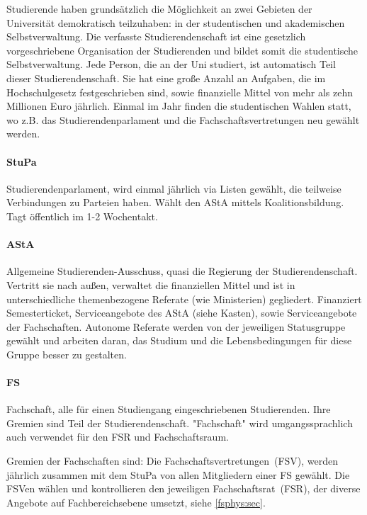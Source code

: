 \begin{multicols*}{2}
Studierende haben grundsätzlich die Möglichkeit an zwei Gebieten der Universität demokratisch teilzuhaben: in der studentischen und akademischen Selbstverwaltung.
Die verfasste Studierendenschaft ist eine gesetzlich vorgeschriebene Organisation der Studierenden und bildet somit die studentische Selbstverwaltung. Jede Person, die an der Uni studiert, ist automatisch Teil dieser Studierendenschaft. Sie hat eine große Anzahl an Aufgaben, die im Hochschulgesetz festgeschrieben sind, sowie finanzielle Mittel von mehr als zehn Millionen Euro jährlich. 
Einmal im Jahr finden die studentischen Wahlen statt, wo z.B. das Studierendenparlament und die Fachschaftsvertretungen neu gewählt werden. 

\paragraph{StuPa}
Studierendenparlament, wird einmal jährlich via Listen gewählt, die teilweise Verbindungen zu Parteien haben. Wählt den AStA mittels Koalitionsbildung. Tagt öffentlich im 1-2 Wochentakt. 


\paragraph{AStA}
Allgemeine Studierenden-Ausschuss, quasi die Regierung der Studierendenschaft. Vertritt sie nach außen, verwaltet die finanziellen Mittel und ist in unterschiedliche themenbezogene Referate (wie Ministerien) gegliedert. Finanziert Semesterticket, Serviceangebote des AStA (siehe Kasten), sowie Serviceangebote der Fachschaften. Autonome Referate werden von der jeweiligen Statusgruppe gewählt und arbeiten daran, das Studium und die Lebensbedingungen für diese Gruppe besser zu gestalten.


\paragraph{FS}
Fachschaft, alle für einen Studiengang eingeschriebenen Studierenden. Ihre Gremien sind Teil der Studierendenschaft. "Fachschaft" wird umgangssprachlich auch verwendet für den FSR und Fachschaftsraum.

Gremien der Fachschaften sind: Die Fachschaftsvertretungen~(FSV), werden jährlich zusammen mit dem StuPa von allen Mitgliedern einer FS gewählt. Die FSVen wählen und kontrollieren den jeweiligen Fachschaftsrat~(FSR), der diverse Angebote auf Fachbereichsebene umsetzt, siehe \cref{fsphys:sec}.


\end{multicols*}
